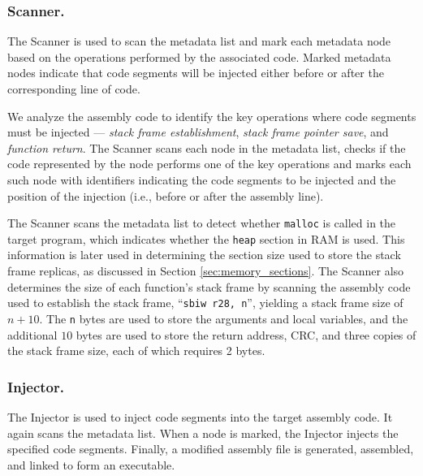 \vspace{-15pt}
\subsubsection{Scanner.}\label{sec:scanner}

The Scanner is used to scan the metadata list and mark each metadata node based on the operations performed by the associated code. Marked metadata nodes indicate that code segments will be injected either before or after the corresponding line of code.

We analyze the assembly code to identify the key operations where code segments must be injected --- \textit{stack frame establishment}, \textit{stack frame pointer save}, and \textit{function return}. The Scanner scans each node in the metadata list, checks if the code represented by the node performs one of the key operations and marks each such node with identifiers indicating the code segments to be injected and the position of the injection (i.e., before or after the assembly line).

The Scanner scans the metadata list to detect whether \texttt{malloc} is called in the target program, which indicates whether the \texttt{heap} section in RAM is used. This information is later used in determining the section size used to store the stack frame replicas, as discussed in Section \ref{sec:memory_sections}. The Scanner also determines the size of each function's stack frame by scanning the assembly code used to establish the stack frame, ``\texttt{sbiw r28, n}'', yielding a stack frame size of $n + 10$. The \texttt{n} bytes are used to store the arguments and local variables, and the additional $10$ bytes are used to store the return address, CRC, and three copies of the stack frame size, each of which requires 2 bytes.
\vspace{-15pt}
\subsubsection{Injector.}

The Injector is used to inject code segments into the target assembly code. It again scans the metadata list. When a node is marked, the Injector injects the specified code segments. Finally, a modified assembly file is generated, assembled, and linked to form an executable.

